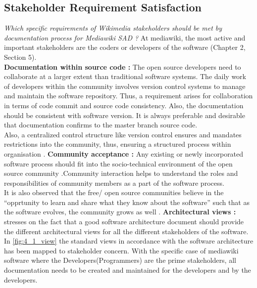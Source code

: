 \subsection{Stakeholder Requirement Satisfaction}
\indent \emph {Which specific requirements of Wikimedia stakeholders should be met by documentation process for Mediawiki SAD ?}
At mediawiki, the most active and important stakeholders are the coders or developers of the software (Chapter 2, Section 5).
\newline
\\\indent \textbf{Documentation within source code : }  The open source developers need to collaborate at a larger extent than traditional software systems. The daily work of developers within the community involves version control systems to manage and maintain the software repository. Thus, a requirement arises for collaboration in terms of code commit and source code consistency. Also, the documentation should be consistent with software version. It is always preferable  and desirable that documentation confirms to the master branch source code.
\\\indent Also, a centralized control structure like version control ensures and mandates restrictions into the community, thus, ensuring a structured process within organisation \cite{Wu2001}.
\newline
\indent \textbf{Community acceptance : }Any existing or newly incorporated software process should fit into the socio-technical environment of the open source community \cite{Mens2011}.Community interaction helps to understand the roles and responsibilities of community members as a part of the software process. 
\\\indent It is also observed that the free/ open source communities believe in the \enquote{opprtunity to learn and share what they know about the software} such that as the software evolves, the community grows as well \cite{Scacchi2006}.
\newline
\indent \textbf{Architectural views : }\cite{BachmannDocumentingSoftware2010} stresses on the fact that a good software architecture document should provide the different architectural views for all the different stakeholders of the software. In \autoref{fig:4_1_view} the standard views in accordance with the software architecture has been mapped to stakeholder concern. With the specific case of mediawiki software where the Developers(Programmers) are the prime stakeholders, all documentation needs to be created and maintained for the developers and by the developers. 

